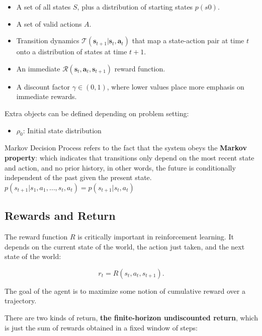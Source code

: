 \begin{itemize}
	\item A set of all states \(S\), plus a distribution of starting states \(p(s0)\).
	\item A set of valid actions \(A\).
	\item Transition dynamics $ \mathcal{T}\left(\mathbf{s}_{t+1} | \mathbf{s}_{t}, \mathbf{a}_{t}\right) $ that map a state-action pair at time \(t\) onto a distribution of states at time \(t+1\).
	\item An immediate $ \mathcal{R}\left(\mathbf{s}_{t}, \mathbf{a}_{t}, \mathbf{s}_{t+1}\right) $ reward function.
	\item A discount factor \(\gamma \in(0,1)\), where lower values place more emphasis on immediate rewards.
\end{itemize}

Extra objects can be defined depending on problem setting:
\begin{itemize}
	\item $\rho_0$: Initial state distribution
\end{itemize}

Markov Decision Process refers to the fact that the system obeys the \textbf{Markov property}: which indicates that transitions only depend on the most recent state and action, and no prior history, in other words, the future is conditionally independent of the past given the present state. $ p\left(s_{t+1} | s_{1}, a_{1}, \ldots, s_{t}, a_{t}\right)=p\left(s_{t+1} | s_{t}, a_{t}\right) $


\subsection{Rewards and Return}

The reward function \(R\) is critically important in reinforcement learning. It depends on the current state of the world, the action just taken, and the next state of the world:

\begin{center}
	\begin{equation}
		r_{t}=R\left(s_{t}, a_{t}, s_{t+1}\right).
	\end{equation}
\end{center}

The goal of the agent is to maximize some notion of cumulative reward over a trajectory.

There are two kinds of return, \textbf{the finite-horizon undiscounted return}, which is just the sum of rewards obtained in a fixed window of steps:

